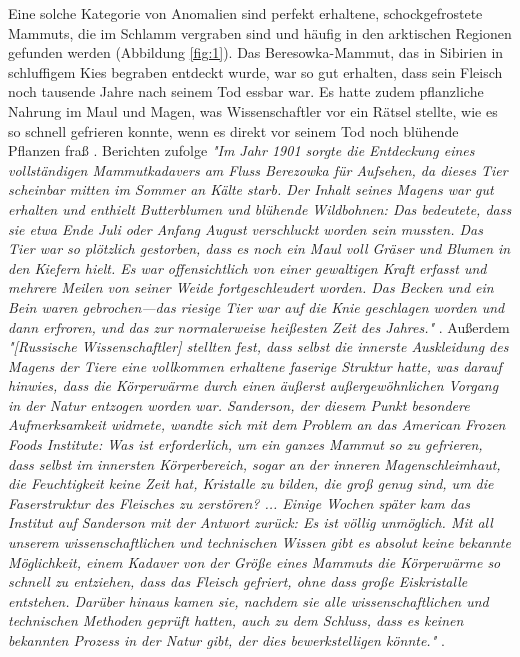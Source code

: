 \documentclass[10pt,twocolumn,letterpaper]{article}
\begin{document}
Eine solche Kategorie von Anomalien sind perfekt erhaltene, schockgefrostete Mammuts, die im Schlamm vergraben sind und häufig in den arktischen Regionen gefunden werden (Abbildung \ref{fig:1}). Das Beresowka-Mammut, das in Sibirien in schluffigem Kies begraben entdeckt wurde, war so gut erhalten, dass sein Fleisch noch tausende Jahre nach seinem Tod essbar war. Es hatte zudem pflanzliche Nahrung im Maul und Magen, was Wissenschaftler vor ein Rätsel stellte, wie es so schnell gefrieren konnte, wenn es direkt vor seinem Tod noch blühende Pflanzen fraß \cite{17}. Berichten zufolge \textit{"Im Jahr 1901 sorgte die Entdeckung eines vollständigen Mammutkadavers am Fluss Berezowka für Aufsehen, da dieses Tier scheinbar mitten im Sommer an Kälte starb. Der Inhalt seines Magens war gut erhalten und enthielt Butterblumen und blühende Wildbohnen: Das bedeutete, dass sie etwa Ende Juli oder Anfang August verschluckt worden sein mussten. Das Tier war so plötzlich gestorben, dass es noch ein Maul voll Gräser und Blumen in den Kiefern hielt. Es war offensichtlich von einer gewaltigen Kraft erfasst und mehrere Meilen von seiner Weide fortgeschleudert worden. Das Becken und ein Bein waren gebrochen—das riesige Tier war auf die Knie geschlagen worden und dann erfroren, und das zur normalerweise heißesten Zeit des Jahres."} \cite{18}. Außerdem \textit{"[Russische Wissenschaftler] stellten fest, dass selbst die innerste Auskleidung des Magens der Tiere eine vollkommen erhaltene faserige Struktur hatte, was darauf hinwies, dass die Körperwärme durch einen äußerst außergewöhnlichen Vorgang in der Natur entzogen worden war. Sanderson, der diesem Punkt besondere Aufmerksamkeit widmete, wandte sich mit dem Problem an das American Frozen Foods Institute: Was ist erforderlich, um ein ganzes Mammut so zu gefrieren, dass selbst im innersten Körperbereich, sogar an der inneren Magenschleimhaut, die Feuchtigkeit keine Zeit hat, Kristalle zu bilden, die groß genug sind, um die Faserstruktur des Fleisches zu zerstören? ... Einige Wochen später kam das Institut auf Sanderson mit der Antwort zurück: Es ist völlig unmöglich. Mit all unserem wissenschaftlichen und technischen Wissen gibt es absolut keine bekannte Möglichkeit, einem Kadaver von der Größe eines Mammuts die Körperwärme so schnell zu entziehen, dass das Fleisch gefriert, ohne dass große Eiskristalle entstehen. Darüber hinaus kamen sie, nachdem sie alle wissenschaftlichen und technischen Methoden geprüft hatten, auch zu dem Schluss, dass es keinen bekannten Prozess in der Natur gibt, der dies bewerkstelligen könnte."} \cite{19}.
\end{document}
